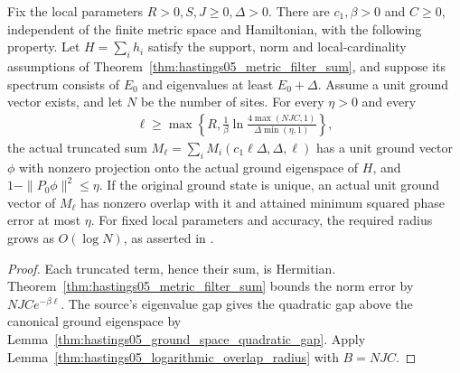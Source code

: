 \begin{lemma}
    \label{thm:hastings05_metric_ground_overlap}
    \leanok
    Fix the local parameters $R>0,S,J\ge0,\Delta>0$. There are
    $c_1,\beta>0$ and $C\ge0$, independent of the finite metric space and
    Hamiltonian, with the following property. Let $H=\sum_i h_i$ satisfy
    the support, norm and local-cardinality assumptions of
    Theorem~\ref{thm:hastings05_metric_filter_sum}, and suppose its spectrum
    consists of $E_0$ and eigenvalues at least $E_0+\Delta$. Assume a unit
    ground vector exists, and let $N$ be the number of sites. For every
    $\eta>0$ and every
    \begin{align}
        \ell\ge\max\left\{R,\frac1\beta
        \ln\frac{4\max(NJC,1)}{\Delta\min(\eta,1)}\right\},
        \label{eq:hastings05_metric_ground_overlap_radius}
    \end{align}
    the actual truncated sum
    $M_\ell=\sum_i M_i(c_1\ell\Delta,\Delta,\ell)$ has a unit ground vector
    $\phi$ with nonzero projection onto the actual ground eigenspace of
    $H$, and $1-\|P_0\phi\|^2\le\eta$. If the original ground state is
    unique, an actual unit ground vector of $M_\ell$ has nonzero overlap
    with it and attained minimum squared phase error at most $\eta$.
    For fixed local parameters and accuracy, the required radius grows
    as $O(\log N)$, as asserted in
    \cite[lines 362--367]{Hastings2006Solving}.
\end{lemma}
\begin{proof}\leanok
    Each truncated term, hence their sum, is Hermitian.
    Theorem~\ref{thm:hastings05_metric_filter_sum} bounds the norm error by
    $NJC e^{-\beta\ell}$. The source's eigenvalue gap gives the quadratic
    gap above the canonical ground eigenspace by
    Lemma~\ref{thm:hastings05_ground_space_quadratic_gap}. Apply
    Lemma~\ref{thm:hastings05_logarithmic_overlap_radius} with $B=NJC$.
\end{proof}
